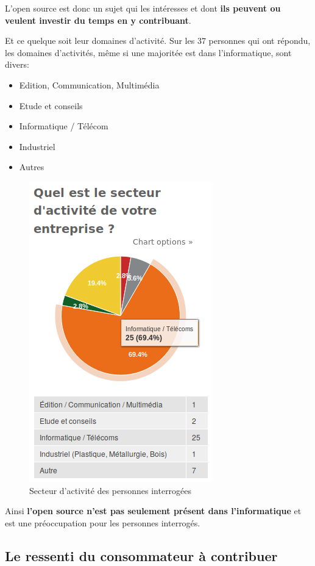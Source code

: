 			L'open source est donc un sujet qui les intéresses et dont \textbf{ils peuvent ou veulent investir du temps en y contribuant}.

			Et ce quelque soit leur domaines d'activité. Sur les 37 personnes qui ont répondu, les domaines d'activités, même si une majoritée est dans l'informatique, sont divers:

			\begin{itemize}[label=\textbullet, font=\LARGE \color{burntorange}]
				\item Edition, Communication, Multimédia
				\item Etude et conseils
				\item Informatique / Télécom
				\item Industriel
				\item Autres
			\end{itemize}

			\begin{figure}[!htb]
				\center
				\includegraphics[scale=0.58]{./img/a1}
				\caption{Secteur d'activité des personnes interrogées}
			\end{figure}

			Ainsi \textbf{l'open source n'est pas seulement présent dans l'informatique} et est une préoccupation pour les personnes interrogés.

		\subsection{Le ressenti du consommateur à contribuer}

